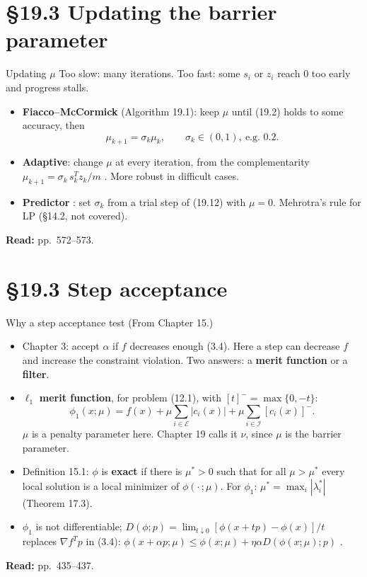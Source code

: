 \documentclass[aspectratio=169,12pt]{beamer}
\newcommand{\gradf}{\nabla f}
\newcommand{\eqn}[1]{\text{\small(#1)}}
\newcommand{\readbook}[1]{{\color{red}\textbf{Read:} #1}}
\newcommand{\cE}{\mathcal{E}}
\newcommand{\cI}{\mathcal{I}}
\newcommand{\from}[1]{{\small(From #1.)}}
\begin{document}
\section{\S19.3 Updating the barrier parameter}

\begin{frame}{Updating $\mu$}
  Too slow: many iterations. Too fast: some $s_{i}$ or $z_{i}$ reach $0$ too early and progress stalls.
  \begin{itemize}\setlength\itemsep{0.3em}
    \item \textbf{Fiacco--McCormick} (Algorithm 19.1): keep $\mu$ until (19.2) holds to some accuracy, then
      \[ \mu_{k+1}=\sigma_{k}\mu_{k},\qquad\sigma_{k}\in(0,1),\ \text{e.g.\ }0.2 . \tag{19.18} \]
    \item \textbf{Adaptive}: change $\mu$ at every iteration, from the complementarity
      $\mu_{k+1}=\sigma_{k}\,s_{k}^{T}z_{k}/m$ \eqn{19.19}. More robust in difficult cases.
    \item \textbf{Predictor} \eqn{19.21--19.22}: set $\sigma_{k}$ from a trial step of (19.12) with $\mu=0$.
      Mehrotra's rule for LP (\S14.2, not covered).
  \end{itemize}
  \readbook{pp.~572--573.}
\end{frame}

\section{\S19.3 Step acceptance}

\begin{frame}{Why a step acceptance test \from{Chapter 15}}
  \begin{itemize}\setlength\itemsep{0.1em}
    \item Chapter 3: accept $\alpha$ if $f$ decreases enough (3.4). Here a step can decrease $f$ and increase the
      constraint violation. Two answers: a \textbf{merit function} or a \textbf{filter}.
    \item $\ell_{1}$ \textbf{merit function}, for problem (12.1), with $[t]^{-}=\max\{0,-t\}$:
      \[ \phi_{1}(x;\mu)=f(x)+\mu\sum_{i\in\cE}|c_{i}(x)|+\mu\sum_{i\in\cI}[c_{i}(x)]^{-} . \tag{15.24} \]
      $\mu$ is a penalty parameter here. Chapter 19 calls it $\nu$, since $\mu$ is the barrier parameter.
    \item Definition 15.1: $\phi$ is \textbf{exact} if there is $\mu^{*}>0$ such that for all $\mu>\mu^{*}$ every local
      solution is a local minimizer of $\phi(\cdot\,;\mu)$. For $\phi_{1}$: $\mu^{*}=\max_{i}|\lambda_{i}^{*}|$ (Theorem 17.3).
    \item $\phi_{1}$ is not differentiable; $D(\phi;p)=\lim_{t\downarrow 0}[\phi(x+tp)-\phi(x)]/t$ replaces $\gradf^{T}p$ in (3.4):
      $\phi(x+\alpha p;\mu)\le\phi(x;\mu)+\eta\alpha D(\phi(x;\mu);p)$ \eqn{15.29}.
  \end{itemize}
  \readbook{pp.~435--437.}
\end{frame}
\end{document}
